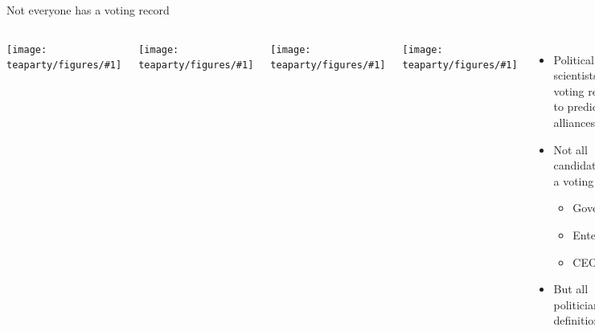 \documentclass[xcolor=dvipsnames]{beamer}
\newcommand{\gfxtp}[2]{
\begin{center}
	\texttt{[image: teaparty/figures/\#1]}
\end{center}
}
\begin{document}
\begin{frame}{Not everyone has a voting record}

  \begin{columns}
        \gfxtp{carson}{.75}
        \gfxtp{fiorina}{.75}
        \gfxtp{walker}{.75}
        \gfxtp{schwarzenegger}{.75}

    \begin{itemize}
      \item Political scientists use voting records to predict alliances
      \item Not all candidates have a voting record
        \begin{itemize}
          \item Governors
          \item Entertainers
          \item CEOs
        \end{itemize}
        \pause
       \item But all politicians---by definition---talk
      \end{itemize}
  \end{columns}

\end{frame}


\end{document}
